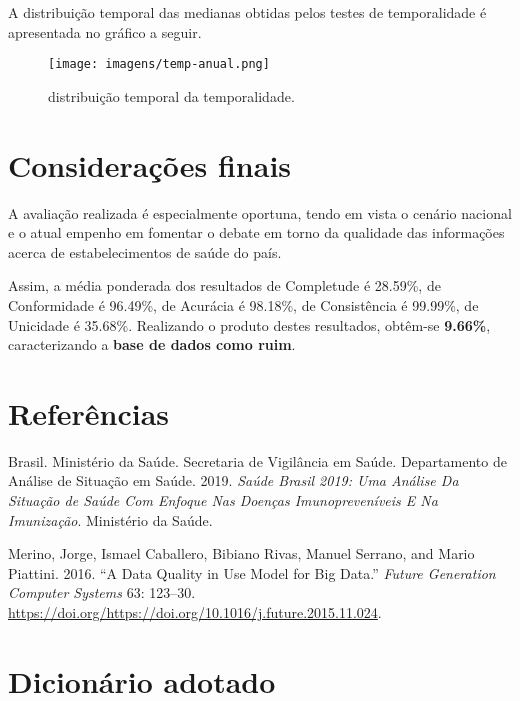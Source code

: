 \documentclass[
  12,
  table]{proadi}
\begin{document}
A distribuição temporal das medianas obtidas pelos testes de
temporalidade é apresentada no gráfico a seguir.

\begin{figure}
\centering
\texttt{[image: imagens/temp-anual.png]}
\caption{distribuição temporal da temporalidade.}
\end{figure}

\hypertarget{considerauxe7uxf5es-finais}{%
\section{Considerações finais}\label{considerauxe7uxf5es-finais}}

A avaliação realizada é especialmente oportuna, tendo em vista o cenário
nacional e o atual empenho em fomentar o debate em torno da qualidade
das informações acerca de estabelecimentos de saúde do país.

Assim, a média ponderada dos resultados de Completude é 28.59\%, de
Conformidade é 96.49\%, de Acurácia é 98.18\%, de Consistência é
99.99\%, de Unicidade é 35.68\%. Realizando o produto destes resultados,
obtêm-se \textbf{9.66\%}, caracterizando a \textbf{base de dados como
ruim}.

\newpage

\hypertarget{referuxeancias}{%
\section{Referências}\label{referuxeancias}}

\hypertarget{refs}{}
\leavevmode\hypertarget{ref-brasil2019}{}%
Brasil. Ministério da Saúde. Secretaria de Vigilância em Saúde.
Departamento de Análise de Situação em Saúde. 2019. \emph{Saúde Brasil
2019: Uma Análise Da Situação de Saúde Com Enfoque Nas Doenças
Imunopreveníveis E Na Imunização}. Ministério da Saúde.

\leavevmode\hypertarget{ref-merino}{}%
Merino, Jorge, Ismael Caballero, Bibiano Rivas, Manuel Serrano, and
Mario Piattini. 2016. ``A Data Quality in Use Model for Big Data.''
\emph{Future Generation Computer Systems} 63: 123--30.
\url{https://doi.org/https://doi.org/10.1016/j.future.2015.11.024}.

\captionsetup[table]{labelformat=empty}

\newpage

\hypertarget{dicionuxe1rio-adotado}{%
\section*{Dicionário adotado}\label{dicionuxe1rio-adotado}}
\end{document}

